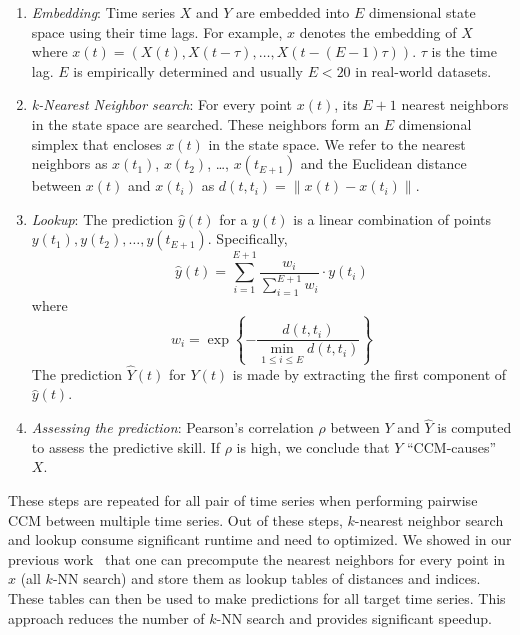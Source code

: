 \documentclass[sigconf]{acmart}
\begin{document}
\begin{enumerate}
    \item \textit{Embedding}: Time series $X$ and $Y$ are embedded into
        $E$ dimensional state space using their time lags. For example,
        $x$ denotes the embedding of $X$ where $x(t)=(X(t), X(t-\tau),
        \dots, X(t-(E-1) \tau))$. $\tau$ is the time lag. $E$ is
        empirically determined and usually $E<20$ in real-world datasets.
    \item \textit{k-Nearest Neighbor search}: For every point $x(t)$,
         its $E+1$ nearest neighbors in the state space are searched. These
         neighbors form an $E$ dimensional simplex that encloses $x(t)$ in the
         state space. We refer to the nearest neighbors as $x(t_1)$, $x(t_2)$,
         \dots, $x(t_{E+1})$ and the Euclidean distance between $x(t)$ and
         $x(t_i)$ as $d(t, t_i) =\lVert x(t) - x(t_i)
        \rVert$.
    \item \textit{Lookup}: The prediction $\hat{y}(t)$ for a $y(t)$ is a
        linear combination of points $y(t_1), y(t_2), \dots, y(t_{E+1})$.
        Specifically,
        \begin{equation*}
            \hat{y}(t) = \sum^{E+1}_{i=1} \frac{w_i}{\sum^{E+1}_{i=1}{w_i}} \cdot y(t_i)
        \end{equation*}
        where
        \begin{equation*}
            w_i = \exp\left\{ -\frac{d(t, t_i)}{\min\limits_{1\leq i \leq E}{d(t, t_i)}}\right\}
        \end{equation*}
        The prediction $\hat{Y}(t)$ for $Y(t)$ is made by extracting the first
        component of $\hat{y}(t)$.
    \item \textit{Assessing the prediction}: Pearson's correlation $\rho$
        between $Y$ and $\hat{Y}$ is computed to assess the predictive skill.
        If $\rho$ is high, we conclude that $Y$ ``CCM-causes'' $X$.
\end{enumerate}

These steps are repeated for all pair of time series when performing pairwise
CCM between multiple time series. Out of these steps, $k$-nearest neighbor
search and lookup consume significant runtime and need to optimized. We showed
in our previous work~\cite{mpedm} that one can precompute the nearest
neighbors for every point in $x$ (all $k$-NN search) and store them as lookup
tables of distances and indices. These tables can then be used to make
predictions for all target time series. This approach reduces the number of
$k$-NN search and provides significant speedup.
\end{document}
